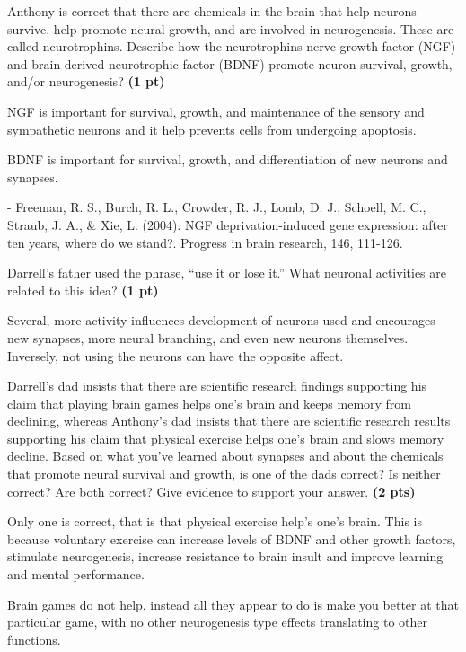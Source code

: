 \documentclass[12pt,a4paper]{article}
\begin{document}
\begin{enumerate}[font=\bfseries, wide]
    {\color{under}\item Anthony is correct that there are chemicals in the brain that help neurons survive, help promote neural growth, and are involved in neurogenesis. These are called neurotrophins. Describe how the neurotrophins nerve growth factor (NGF) and brain-derived neurotrophic factor (BDNF) promote neuron survival, growth, and/or neurogenesis? \textbf{(1 pt)}}

    NGF is important for survival, growth, and maintenance of the sensory and sympathetic neurons and it help prevents cells from undergoing apoptosis. 

    BDNF is important for survival, growth, and differentiation of new neurons and synapses.

    - Freeman, R. S., Burch, R. L., Crowder, R. J., Lomb, D. J., Schoell, M. C., Straub, J. A., \& Xie, L. (2004). NGF deprivation-induced gene expression: after ten years, where do we stand?. Progress in brain research, 146, 111-126.


    {\color{under}\item Darrell’s father used the phrase, “use it or lose it.” What neuronal activities are related to this idea? \textbf{(1 pt)}}

    Several, more activity influences development of neurons used and encourages new synapses, more neural branching, and even new neurons themselves. Inversely, not using the neurons can have the opposite affect.

    {\color{under}\item Darrell’s dad insists that there are scientific research findings supporting his claim that playing brain games helps one’s brain and keeps memory from declining, whereas Anthony’s dad insists that there are scientific research results supporting his claim that physical exercise helps one’s brain and slows memory decline. Based on what you’ve learned about synapses and about the chemicals that promote neural survival and growth, is one of the dads correct? Is neither correct? Are both correct? Give evidence to support your answer. \textbf{(2 pts)}}

    Only one is correct, that is that physical exercise help's one's brain. This is because voluntary exercise can increase levels of BDNF and other growth factors, stimulate neurogenesis, increase resistance to brain insult and improve learning and mental performance.

    Brain games do not help, instead all they appear to do is make you better at that particular game, with no other neurogenesis type effects translating to other functions.


\end{enumerate}
\end{document}
